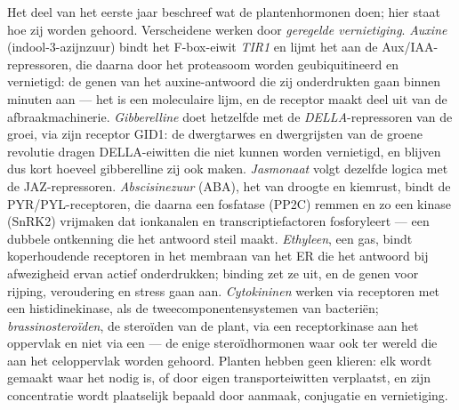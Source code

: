 \begin{definition}\label{def:b3:plant-molecular-physiology:hormones}
Het deel van het eerste jaar beschreef wat de plantenhormonen doen;
hier staat hoe zij worden gehoord. Verscheidene werken door
\emph{geregelde vernietiging}. \emph{Auxine} (indool-3-azijnzuur) bindt
het F-box-eiwit \emph{TIR1} en lijmt het aan de Aux/IAA-repressoren,
die daarna door het proteasoom worden geubiquitineerd en vernietigd: de
genen van het auxine-antwoord die zij onderdrukten gaan binnen minuten
aan --- het  is een moleculaire lijm, en de receptor maakt deel
uit van de afbraakmachinerie. \emph{Gibberelline} doet hetzelfde met de
\emph{DELLA}-repressoren van de groei, via zijn receptor GID1: de
dwergtarwes en dwergrijsten van de groene revolutie dragen
DELLA-eiwitten die niet kunnen worden vernietigd, en blijven dus kort
hoeveel gibberelline zij ook maken. \emph{Jasmonaat} volgt dezelfde
logica met de JAZ-repressoren. \emph{Abscisinezuur} (ABA), het 
van droogte en kiemrust, bindt de PYR/PYL-receptoren, die daarna een
fosfatase (PP2C) remmen en zo een kinase (SnRK2) vrijmaken dat
ionkanalen en transcriptiefactoren fosforyleert --- een dubbele
ontkenning die het antwoord steil maakt. \emph{Ethyleen}, een gas,
bindt koperhoudende receptoren in het membraan van het ER die het
antwoord bij afwezigheid ervan actief onderdrukken; binding zet ze uit,
en de genen voor rijping, veroudering en stress gaan aan.
\emph{Cytokininen} werken via receptoren met een histidinekinase, als
de tweecomponentensystemen van bacteriën; \emph{brassinosteroïden}, de
steroïden van de plant, via een receptorkinase aan het oppervlak en
niet via een  --- de enige steroïdhormonen waar ook ter
wereld die aan het celoppervlak worden gehoord. Planten hebben geen
klieren: elk  wordt gemaakt waar het nodig is, of door eigen
transporteiwitten verplaatst, en zijn concentratie wordt plaatselijk
bepaald door aanmaak, conjugatie en vernietiging.
\end{definition}

